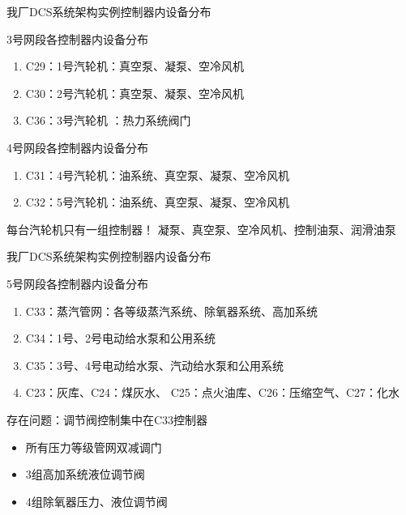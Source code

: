 \documentclass[12pt,hyperref={CJKbookmarks=true}]{beamer} %
\begin{document}
\begin{frame}{我厂DCS系统架构实例}{控制器内设备分布}
\begin{block}{\heiti 3号网段各控制器内设备分布}
			\begin{enumerate}
				\item  C29：1号汽轮机：真空泵、凝泵、空冷风机
				
				\item   C30：2号汽轮机：真空泵、凝泵、空冷风机
				
				\item  C36：3号汽轮机	：热力系统阀门
		\end{enumerate}
		\end{block}
\pause
\begin{block}{\heiti 4号网段各控制器内设备分布}
			\begin{enumerate}
				\item  C31：4号汽轮机：油系统、真空泵、凝泵、空冷风机
				
				\item   C32：5号汽轮机：油系统、真空泵、凝泵、空冷风机
		\end{enumerate}
		\end{block}
\pause
\begin{alertblock}{\heiti 每台汽轮机只有一组控制器！}
			凝泵、真空泵、空冷风机、控制油泵、润滑油泵
		\end{alertblock}
\end{frame}
\begin{frame}{我厂DCS系统架构实例}{控制器内设备分布}
\begin{block}{\heiti 5号网段各控制器内设备分布}
			\begin{enumerate}
				

				\item  C33：蒸汽管网：各等级蒸汽系统、除氧器系统、高加系统	

				\item  C34：1号、2号电动给水泵和公用系统	

				\item  C35：3号、4号电动给水泵、汽动给水泵和公用系统	

\item  C23：灰库、C24：煤灰水、 C25：点火油库、C26：压缩空气、C27：化水
			
		\end{enumerate}
		\end{block}
		\begin{alertblock}{\heiti 存在问题：调节阀控制集中在C33控制器}
\begin{itemize}
			\item 所有压力等级管网双减调门\\
			\item 3组高加系统液位调节阀\\
			\item 4组除氧器压力、液位调节阀
\end{itemize}
\end{alertblock}
\end{frame}
\end{document}

